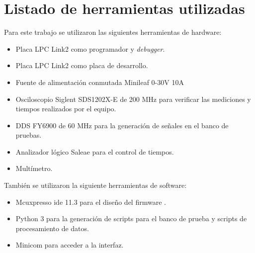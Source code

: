 \section{Listado de herramientas utilizadas}
Para este trabajo se utilizaron las siguientes herramientas de hardware:
\begin{itemize}
\item Placa LPC Link2 como programador y \textit{debugger}.
\item Placa LPC Link2 como placa de desarrollo.
\item Fuente de alimentación conmutada Minileaf 0-30V 10A
\item Osciloscopio Siglent SDS1202X-E de 200 MHz para verificar las mediciones y tiempos realizados por el equipo.
\item DDS FY6900 de 60 MHz para la generación de señales en el banco de pruebas.
\item Analizador lógico Saleae para el control de tiempos.
\item Multímetro.
\end{itemize}


También se utilizaron la siguiente herramientas de software:
\begin{itemize}
\item Mcuxpresso ide 11.3 para el diseño del firmware \citep{mcuxpresso}.
\item Python 3 para la generación de scripts para el banco de prueba y scripts de procesamiento de datos.
\item Minicom para acceder a la interfaz.
\end{itemize}
